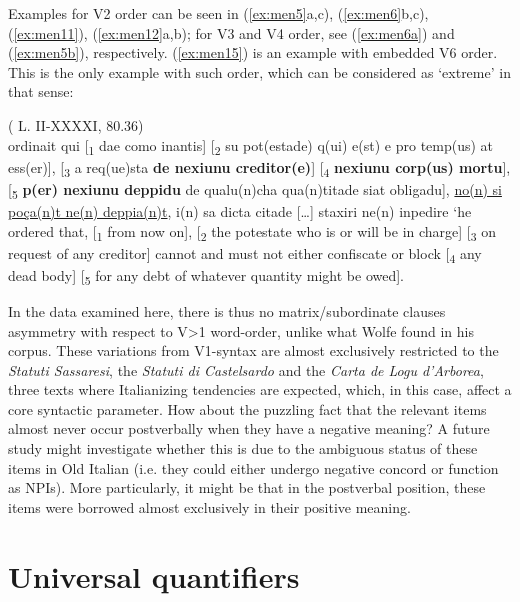 \documentclass[output=paper,colorlinks,citecolor=brown]{langscibook}
\begin{document}
Examples for V2 order can be seen  in (\ref{ex:men5}a,c), (\ref{ex:men6}b,c), (\ref{ex:men11}), (\ref{ex:men12}a,b); for V3 and V4 order, see (\ref{ex:men6a}) and (\ref{ex:men5b}), respectively. (\ref{ex:men15}) is an example with embedded V6 order. This is the only example with such order, which can be considered as ‘extreme’ in that sense:

\ea\label{ex:men15}( L. II-XXXXI, 80.36)\\
ordinait qui [\textsubscript{1} dae como inantis] [\textsubscript{2} su pot(estade) q(ui) e(st) e pro temp(us) at ess(er)], [\textsubscript{3} a req(ue)sta \textbf{de nexiunu creditor(e)}] [\textsubscript{4} \textbf{nexiunu corp(us) mortu}], [\textsubscript{5} \textbf{p(er) nexiunu deppidu} de qualu(n)cha qua(n)titade siat obligadu], \ul{no(n) si poça(n)t ne(n) deppia(n)t}, i(n) sa dicta citade […] staxiri ne(n) inpedire
\glt ‘he ordered that, [\textsubscript{1} from now on], [\textsubscript{2} the potestate who is or will be in charge] [\textsubscript{3} on request of any creditor] cannot and must not either confiscate or block [\textsubscript{4} any dead body] [\textsubscript{5} for any debt of whatever quantity might be owed].
\z

In the data examined here, there is thus no matrix/subordinate clauses asymmetry with respect to V>1 word-order, unlike what Wolfe found in his corpus. These variations from V1-syntax are almost exclusively restricted to the \textit{Statuti Sassaresi}, the \textit{Statuti di Castelsardo} and the \textit{Carta de Logu d’Arborea}, three texts where Italianizing tendencies are expected, which, in this case, affect a core syntactic parameter. How about the puzzling fact that the relevant items almost never occur postverbally when they have a negative meaning? A future study might investigate whether this is due to the ambiguous status of these items in Old Italian (i.e. they could either undergo negative concord or function as NPIs). More particularly, it might be that in the postverbal position, these items were borrowed almost exclusively in their positive meaning. 

\section{Universal quantifiers}\label{sec:men4}
\end{document}
